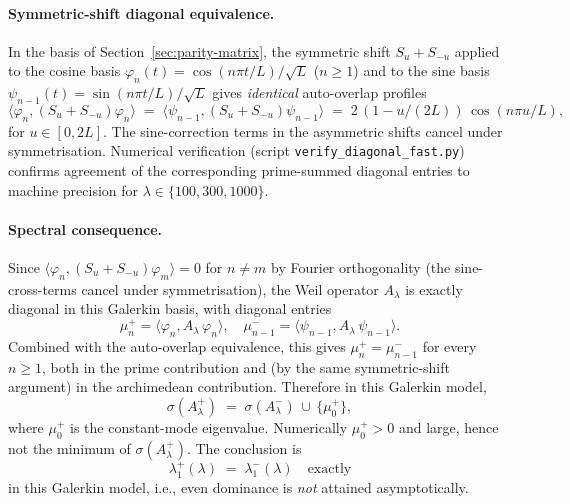 \documentclass[11pt,a4paper]{article}
\theoremstyle{remark}
\theoremstyle{plain}
\begin{document}
\paragraph{Symmetric-shift diagonal equivalence.} In the basis of
Section~\ref{sec:parity-matrix}, the symmetric shift $S_u + S_{-u}$
applied to the cosine basis $\varphi_n(t) = \cos(n\pi t/L)/\sqrt L$
($n\geq 1$) and to the sine basis $\psi_{n-1}(t) = \sin(n\pi t/L)/\sqrt L$
gives \emph{identical} auto-overlap profiles
\[
  \langle\varphi_n, (S_u+S_{-u})\varphi_n\rangle
  \;=\; \langle\psi_{n-1}, (S_u+S_{-u})\psi_{n-1}\rangle
  \;=\; 2\,(1 - u/(2L))\,\cos(n\pi u/L),
\]
for $u \in [0,2L]$. The sine-correction terms in the asymmetric
shifts cancel under symmetrisation. Numerical verification
(script \texttt{verify\_diagonal\_fast.py}) confirms agreement of the
corresponding prime-summed diagonal entries to machine precision for
$\lambda \in \{100, 300, 1000\}$.

\paragraph{Spectral consequence.} Since
$\langle\varphi_n, (S_u+S_{-u})\varphi_m\rangle = 0$ for $n\neq m$ by
Fourier orthogonality (the sine-cross-terms cancel under symmetrisation),
the Weil operator $A_\lambda$ is exactly diagonal in this Galerkin
basis, with diagonal entries
\[
  \mu^+_n
  = \langle\varphi_n, A_\lambda\,\varphi_n\rangle,
  \quad
  \mu^-_{n-1}
  = \langle\psi_{n-1}, A_\lambda\,\psi_{n-1}\rangle.
\]
Combined with the auto-overlap equivalence, this gives
$\mu^+_n = \mu^-_{n-1}$ for every $n \geq 1$, both in the prime
contribution and (by the same symmetric-shift argument) in the
archimedean contribution. Therefore in this Galerkin model,
\[
  \sigma(A_\lambda^+) \;=\; \sigma(A_\lambda^-)\,\cup\,\{\mu^+_0\},
\]
where $\mu^+_0$ is the constant-mode eigenvalue. Numerically
$\mu^+_0 > 0$ and large, hence not the minimum of $\sigma(A_\lambda^+)$.
The conclusion is
\[
  \lambda_1^+(\lambda) \;=\; \lambda_1^-(\lambda) \quad\text{exactly}
\]
in this Galerkin model, i.e., even dominance is \emph{not} attained
asymptotically.
\end{document}
